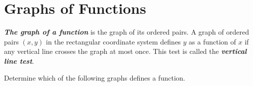 \documentclass[
  en,11pt]{elegantbook}
\let\BeginKnitrBlock\begin \let\EndKnitrBlock\end
\begin{document}
\hypertarget{graphs-of-functions}{%
\section{Graphs of Functions}\label{graphs-of-functions}}

\textbf{\emph{The graph of a function}} is the graph of its ordered pairs. A graph of ordered pairs \((x,y)\) in the rectangular coordinate system defines \(y\) as a function of \(x\) if any vertical line crosses the graph at most once. This test is called the \textbf{\emph{vertical line test}}.

\BeginKnitrBlock{example}
\protect\hypertarget{exm:unnamed-chunk-221}{}{\label{exm:unnamed-chunk-221} }
Determine which of the following graphs defines a function.
\EndKnitrBlock{example}

\begin{figure}

{\centering {}

}

\caption{ }\label{fig:fig-ABCD-LaTeX}
\end{figure}
\end{document}
